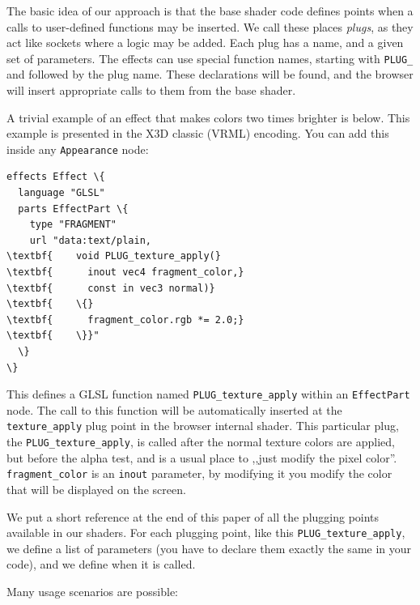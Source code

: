 \documentclass{acmsiggraph}                     %
\begin{document}
The basic idea of our approach is that the base shader code defines
points when a calls to user-defined functions may be inserted. We call
these places \textit{plugs}, as they act like sockets where a logic
may be added. Each plug has a name, and a given set of parameters.
The effects can use special function names, starting with \texttt{PLUG\_}
and followed by the plug name. These declarations will be found,
and the browser will insert appropriate calls to them from the base shader.

A trivial example of an effect that makes colors two times brighter
is below. This example is presented in the X3D classic (VRML) encoding.
You can add this inside any \texttt{Appearance} node:

\begin{Verbatim}[commandchars=\\\{\},frame=single]
effects Effect \{
  language "GLSL"
  parts EffectPart \{
    type "FRAGMENT"
    url "data:text/plain,
\textbf{    void PLUG_texture_apply(}
\textbf{      inout vec4 fragment_color,}
\textbf{      const in vec3 normal)}
\textbf{    \{}
\textbf{      fragment_color.rgb *= 2.0;}
\textbf{    \}}"
  \}
\}
\end{Verbatim}

This defines a GLSL function named \texttt{PLUG\_texture\_apply}
within an \texttt{EffectPart} node. The call to this function will
be automatically inserted at the \texttt{texture\_apply} plug point in
the browser internal shader. This particular plug,
the \texttt{PLUG\_texture\_apply}, is called after the normal texture colors
are applied, but before the alpha test, and is a usual place to ,,just modify the pixel color''.
\texttt{fragment\_color} is an \texttt{inout} parameter, by modifying it
you modify the color that will be displayed on the screen.

We put a short reference at the end of this paper of all
the plugging points available in our shaders. For each plugging point,
like this \texttt{PLUG\_texture\_apply}, we define a list of parameters
(you have to declare them exactly the same in your code), and we define
when it is called.

Many usage scenarios are possible:
\end{document}
